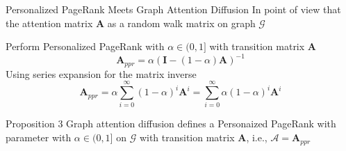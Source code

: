 \documentclass[notheorems, aspectratio=149]{beamer}
\begin{document}
		\begin{frame}{Personalized PageRank Meets Graph Attention Diffusion}
			In point of view that the attention matrix $\mathbf{A}$ as a random walk matrix on graph $\mathcal{G}$
			
			Perform Personalized PageRank with $\alpha \in (0, 1]$ with transition matrix $\mathbf{A}$
			\begin{equation}
				\mathbf{A}_{ppr} = \alpha(\mathbf{I} - (1-\alpha)\mathbf{A})^{-1}
			\end{equation}
			Using series expansion for the matrix inverse
			\begin{equation}
				\mathbf{A}_{ppr} = \alpha\sum_{i=0}^{\infty}(1-\alpha)^i\mathbf{A}^i = \sum_{i=0}^{\infty}\alpha(1-\alpha)^i\mathbf{A}^i 
			\end{equation}
			\begin{block}{Proposition 3}
				Graph attention diffusion defines a Personaized PageRank with parameter with $\alpha \in (0, 1]$ on $\mathcal{G}$ with transition matrix $\mathbf{A}$, i.e., $\mathcal{A} = \mathbf{A}_{ppr}$
			\end{block}
		\end{frame}
\end{document}

